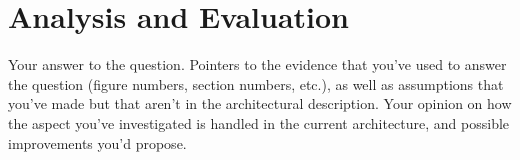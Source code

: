 \documentclass{sareport}
\begin{document}
\maketitle

\chapter*{Analysis and Evaluation}

{%
	Your answer to the question.
}{%
	Pointers to the evidence that you've used to answer the question (figure numbers, section numbers, etc.), as well as assumptions that you've made but that aren't in the architectural description.
}{%
	Your opinion on how the aspect you've investigated is handled in the current architecture, and possible improvements you'd propose.
}
\end{document}
